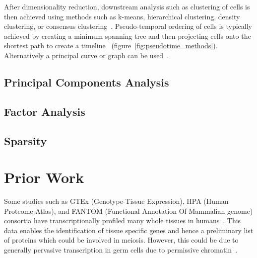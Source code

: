 After dimensionality reduction, downstream analysis such as clustering of cells is then achieved using methods such as k-means, hierarchical clustering, density clustering, or consensus clustering~\cite{Zurauskiene2016pcaReduce,Kiselev2017SC3,Guo2015SINCERA,Satija2015Spatial}. Pseudo-temporal ordering of cells is typically achieved by creating a minimum spanning tree and then projecting cells onto the shortest path to create a timeline~\cite{Trapnell2014dynamics,Ji2016TSCAN} (figure~\ref{fig:pseudotime_methods}). Alternatively a principal curve or graph can be used~\cite{Marco2014Bifurcation,Qiu2017Reversed}.




\subsection{Principal Components Analysis}

\subsection{Factor Analysis}

\subsection{Sparsity}




\section{Prior Work}


Some studies such as GTEx (Genotype-Tissue Expression), HPA (Human Proteome Atlas), and FANTOM (Functional Annotation Of Mammalian genome) consortia have transcriptionally profiled many whole tissues in humans~\cite{Mele2015Human,Uhlen2015Tissuebased,Uhlen2016Transcriptomics}. This data enables the identification of tissue specific genes and hence a preliminary list of proteins which could be involved in meiosis.  However, this could be due to generally pervasive transcription in germ cells due to permissive chromatin~\cite{Soumillon2013Cellular}.



